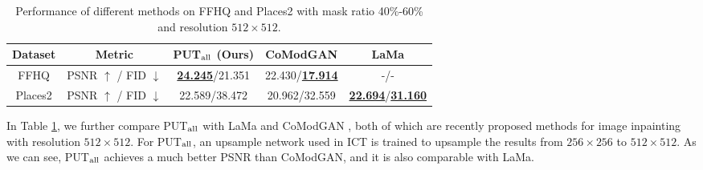 \documentclass[10pt,twocolumn,letterpaper]{article}
\begin{document}
\begin{table}[t]
	\setlength{\tabcolsep}{0.0pt}
	\footnotesize
\centering
    \begin{tabular}{c|c|c|c|c}
        \hline
        Dataset &Metric & PUT$_{\rm all}$ (Ours) &CoModGAN \cite{zhao2021comodgan}
        & LaMa\cite{suvorov2022resolution} \\
        \hline
        FFHQ \cite{karras2019style} &PSNR $\uparrow$ / FID $\downarrow$ &\underline{\bf 24.245}/21.351 &22.430/\underline{\bf 17.914} &-/- \\
        \hline
        Places2 \cite{zhou2017places} & PSNR $\uparrow$ / FID $\downarrow$ &22.589/38.472 &20.962/32.559 &\underline{\bf 22.694}/\underline{\bf 31.160}   \\
        \hline
    \end{tabular}
    \caption{Performance of different methods on FFHQ \cite{karras2019style} and Places2 \cite{zhou2017places} with mask ratio 40\%-60\% and resolution $512\times 512$.}
    \label{tab:comparison_sota_ffhq_places2}
\end{table}

In Table \ref{tab:comparison_sota_ffhq_places2}, we further compare PUT$_{\rm all}$ with LaMa \cite{suvorov2022resolution} and CoModGAN \cite{zhao2021comodgan}, both of which are recently proposed methods for image inpainting with resolution $512 \times 512$. For PUT$_{\rm all}$, an upsample network used in ICT \cite{wan2021high} is trained to upsample the results from $256\times256$ to $512\times512$. As we can see, PUT$_{\rm all}$ achieves a much better PSNR than CoModGAN, and it is also comparable with LaMa.
\end{document}
